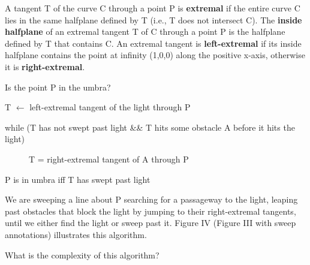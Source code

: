 \documentclass[9pt]{article}
\begin{document}
\begin{defn2}
A tangent T of the curve C through a point P is {\bf extremal}
if the entire curve C lies in the same halfplane defined by T
(i.e., T does not intersect C).
The {\bf inside halfplane} of an extremal tangent T of C through a point P is
the halfplane defined by T that contains C.
An extremal tangent is {\bf left-extremal} if its inside halfplane 
contains the point at infinity (1,0,0) along the positive x-axis,
otherwise it is {\bf right-extremal}.
\end{defn2}

Is the point P in the umbra?
\begin{description}
\item[] T $\leftarrow$ left-extremal tangent of the light through P
\item[] while (T has not swept past light \&\& 
       T hits some obstacle A before it hits the light)
\begin{description}
\item[]	T = right-extremal tangent of A through P
\end{description}
\item P is in umbra iff T has swept past light
\end{description}

We are sweeping a line about P searching for a passageway to the light, 
leaping past obstacles that block the light by jumping to their right-extremal tangents, 
until we either find the light or sweep past it.
Figure IV (Figure III with sweep annotations) illustrates this algorithm.

What is the complexity of this algorithm?

\end{document}
